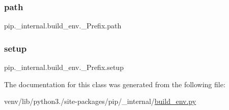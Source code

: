 \subsubsection{\texorpdfstring{path}{path}}
{\footnotesize\ttfamily pip.\+\_\+internal.\+build\+\_\+env.\+\_\+\+Prefix.\+path}

\mbox{\label{classpip_1_1__internal_1_1build__env_1_1__Prefix_a8c3f4312adc6d324a36d6dfb1227663f}} 
\subsubsection{\texorpdfstring{setup}{setup}}
{\footnotesize\ttfamily pip.\+\_\+internal.\+build\+\_\+env.\+\_\+\+Prefix.\+setup}



The documentation for this class was generated from the following file\+:\begin{DoxyCompactItemize}
\item 
venv/lib/python3./site-\/packages/pip/\+\_\+internal/\hyperlink{build__env_8py}{build\+\_\+env.\+py}\end{DoxyCompactItemize}
